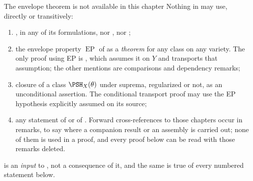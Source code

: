 \begin{warning}{The envelope theorem is not available in this chapter}
\label{warn:ch43-firewall}
Nothing in  may use, directly or
transitively:
\begin{enumerate}
\item {}, in any of its formulations, nor
      , nor
      ;
\item the envelope property $\operatorname{EP}$ of
       as a \emph{theorem} for any class on
      any variety.  The only proof using EP is
      , which assumes it on $Y$ and
      transports that assumption; the other mentions are comparisons
      and dependency remarks;
\item closure of a class $\PSH_X(\theta)$ under suprema, regularized
      or not, as an unconditional assertion.  The conditional transport
      proof may use the EP hypothesis explicitly assumed on its source;
\item any statement of  or of
      .  Forward cross-references to
      those chapters occur in remarks, to say where a companion result or an
      assembly is carried out; none of them is used in a proof, and every
      proof below can be read with those remarks deleted.
\end{enumerate}
 is an \emph{input} to
, not a consequence of it, and the same is true
of every numbered statement below.
\end{warning}

